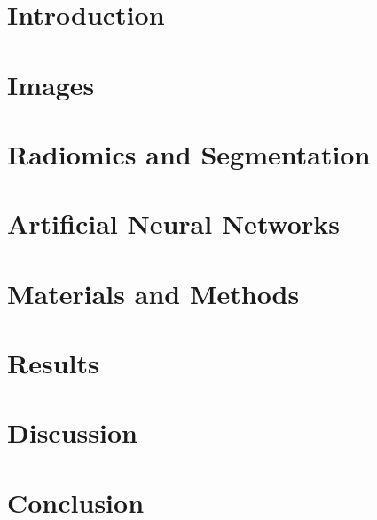 \documentclass[12pt,a4paper]{report}
\begin{document}
\begin{titlepage}

\end{titlepage}


\clearpage{\pagestyle{empty}}
\tableofcontents               
{}


\clearpage{\pagestyle{empty}}
\chapter*{Introduction}



\chapter{Images}\label{chap:images}


\newpage

\chapter{Radiomics and Segmentation}\label{chap:segmentation}




\chapter{Artificial Neural Networks}\label{chap:ann}


\chapter{Materials and Methods}\label{chap:methods}


\chapter{Results}\label{chap:results}



\chapter{Discussion}


\clearpage{\pagestyle{empty}}
\chapter*{Conclusion}

\printbibliography[
heading=bibintoc,
title={Bibliography}
] 
\end{document}
